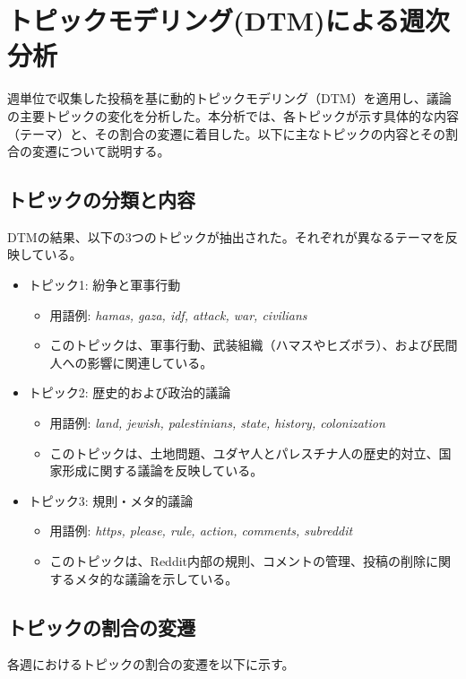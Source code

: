 \documentclass[11pt, a4j]{jreport}
\begin{document}
    \section{トピックモデリング(DTM)による週次分析}

    週単位で収集した投稿を基に動的トピックモデリング（DTM）を適用し、議論の主要トピックの変化を分析した。本分析では、各トピックが示す具体的な内容（テーマ）と、その割合の変遷に着目した。以下に主なトピックの内容とその割合の変遷について説明する。

    \subsection*{トピックの分類と内容}
    DTMの結果、以下の3つのトピックが抽出された。それぞれが異なるテーマを反映している。

    \begin{itemize}
        \item トピック1: 紛争と軍事行動 
        \begin{itemize}
            \item 用語例: \textit{hamas, gaza, idf, attack, war, civilians}  
            \item このトピックは、軍事行動、武装組織（ハマスやヒズボラ）、および民間人への影響に関連している。
        \end{itemize}
        \item トピック2: 歴史的および政治的議論  
        \begin{itemize}
            \item 用語例: \textit{land, jewish, palestinians, state, history, colonization}  
            \item このトピックは、土地問題、ユダヤ人とパレスチナ人の歴史的対立、国家形成に関する議論を反映している。
        \end{itemize}
        \item トピック3: 規則・メタ的議論  
        \begin{itemize}
            \item 用語例: \textit{https, please, rule, action, comments, subreddit}  
            \item このトピックは、Reddit内部の規則、コメントの管理、投稿の削除に関するメタ的な議論を示している。
        \end{itemize}
    \end{itemize}

    \subsection*{トピックの割合の変遷}
    各週におけるトピックの割合の変遷を以下に示す。
\end{document}
